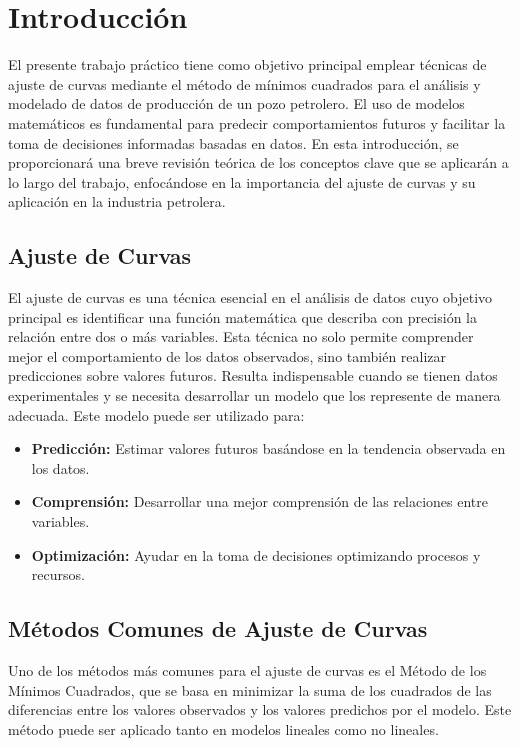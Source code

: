 \chapter{Introducción}

El presente trabajo práctico tiene como objetivo principal emplear técnicas de ajuste de curvas mediante el método de mínimos cuadrados para el análisis y modelado de datos de producción de un pozo petrolero. El uso de modelos matemáticos es fundamental para predecir comportamientos futuros y facilitar la toma de decisiones informadas basadas en datos. En esta introducción, se proporcionará una breve revisión teórica de los conceptos clave que se aplicarán a lo largo del trabajo, enfocándose en la importancia del ajuste de curvas y su aplicación en la industria petrolera.

\section{Ajuste de Curvas} 

El ajuste de curvas es una técnica esencial en el análisis de datos cuyo objetivo principal es identificar una función matemática que describa con precisión la relación entre dos o más variables. Esta técnica no solo permite comprender mejor el comportamiento de los datos observados, sino también realizar predicciones sobre valores futuros. Resulta indispensable cuando se tienen datos experimentales y se necesita desarrollar un modelo que los represente de manera adecuada. Este modelo puede ser utilizado para:

\begin{itemize}
\item \textbf{Predicción:} Estimar valores futuros basándose en la tendencia observada en los datos.
\item \textbf{Comprensión:} Desarrollar una mejor comprensión de las relaciones entre variables.
\item \textbf{Optimización:} Ayudar en la toma de decisiones optimizando procesos y recursos.
\end{itemize}

\section{Métodos Comunes de Ajuste de Curvas}

Uno de los métodos más comunes para el ajuste de curvas es el Método de los Mínimos Cuadrados, que se basa en minimizar la suma de los cuadrados de las diferencias entre los valores observados y los valores predichos por el modelo. Este método puede ser aplicado tanto en modelos lineales como no lineales.

